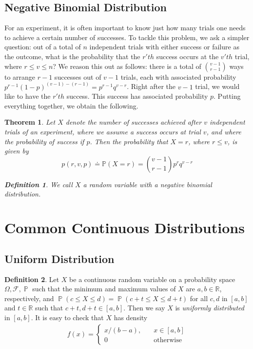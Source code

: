 \documentclass[12pt]{amsbook}
\newcommand{\rr}{\mathbb{R}}
\newcommand{\filter}{\mathcal{F}}
\DeclareMathOperator{\prob}{\mathbb{P}}
\theoremstyle{plain}
\newtheorem{theorem}{Theorem}
\theoremstyle{definition}
\newtheorem*{definition}{Definition}
\theoremstyle{remark}
\numberwithin{equation}{section}  %
\numberwithin{equation}{section}  %
\begin{document}
\subsection{Negative Binomial Distribution}
For an experiment, it is often important to know just how many trials
one needs to achieve a certain number of successes. To tackle this problem,
we ask a simpler question: out of a total of $n$ independent trials with
either success or failure as the outcome, what is the probability
that the $r'th$ success occurs at the $v'th$ trial, where $r \le v \le n$?
We reason this out as follows: there is a total of $\binom{v-1}{r-1}$ ways to
arrange $r-1$ successes out of $v-1$ trials, each with associated probability
$p^{r-1}{(1 - p)}^{(v-1) - (r-1)} = p^{r-1}q^{v-r}$. Right after the $v-1$ 
trial, we would like to
have the $r'th$ success. This success has associated probability $p$. Putting
everything together, we obtain the following.
\begin{theorem}
	Let $X$ denote the number of successes achieved after $v$ independent 
	trials of an experiment,
	where we assume a success occurs at trial $v$, and where the probability
	of success if $p$. Then the probability that $X=r$, where $r \le v$, is 
	given by
	\begin{equation*}
		p(r, v, p) \doteq \mathbb{P}(X = r) = \binom{v-1}{r-1} p^{r} q^{v-r}
	\end{equation*}
	\begin{definition}
		We call $X$ a random variable with a \emph{negative binomial 
		distribution}.
	\end{definition}
\end{theorem}
\section{Common Continuous Distributions}
\subsection{Uniform Distribution}
\begin{definition}
	Let $X$ be a continuous random variable on a probability space $\Omega, 
	\filter,
	\prob$ such that the minimum and maximum values of $X$ are $a,b \in \rr$,
	respectively, and $\prob(c \le X \le d ) = \prob(c + t \le X \le d + t)$
	for all $c, d$ in $[a,b]$  and $t \in \rr$ such that $c+t, d+t \in [a,b]$.
	Then we say $X$ is \emph{uniformly distributed} in $[a,b]$. It is easy to 
	check
	that $X$ has density  
	\begin{align*}
		f(x) = \begin{cases}
			x/(b-a), \quad & x \in [a,b] \\
			0 \quad &\text{otherwise}
		\end{cases}
	\end{align*}
\end{definition}
\end{document}
